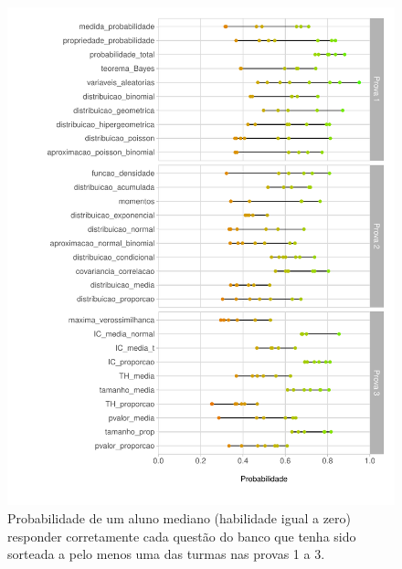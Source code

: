 \documentclass[a4paper]{report}
\begin{document}
\begin{figure}
\centering
\includegraphics{Relatorio_files/figure-latex/unnamed-chunk-5-1.pdf}
\caption{Probabilidade de um aluno mediano (habilidade igual a zero)
responder corretamente cada questão do banco que tenha sido sorteada a
pelo menos uma das turmas nas provas 1 a 3.}
\end{figure}
\end{document}
